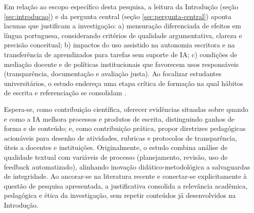 Em relação ao escopo específico desta pesquisa, a leitura da Introdução (seção \ref{sec:introducao}) e da pergunta central (seção \ref{sec:pergunta-central}) aponta lacunas que justificam a investigação: a) mensuração diferenciada de efeitos em língua portuguesa, considerando critérios de qualidade argumentativa, clareza e precisão conceitual; b) impactos do uso assistido na autonomia escritora e na transferência de aprendizados para tarefas sem suporte de IA; c) condições de mediação docente e de políticas institucionais que favorecem usos responsáveis (transparência, documentação e avaliação justa). Ao focalizar estudantes universitários, o estudo endereça uma etapa crítica de formação na qual hábitos de escrita e referenciação se consolidam \cite{unesco2023diretrizes}.

Espera-se, como contribuição científica, oferecer evidências situadas sobre quando e como a IA melhora processos e produtos de escrita, distinguindo ganhos de forma e de conteúdo; e, como contribuição prática, propor diretrizes pedagógicas acionáveis para desenho de atividades, rubricas e protocolos de transparência, úteis a docentes e instituições. Originalmente, o estudo combina análise de qualidade textual com variáveis de processo (planejamento, revisão, uso de feedback automatizado), alinhando inovação didático-metodológica a salvaguardas de integridade. Ao ancorar-se na literatura recente \cite{kobak2025llm,geng2024style,yeadon2024ai,thorp2023notauthor,nature2023groundrules,cope2023ai,wame2023recs,icmje2023ai,unesco2023diretrizes,educause2023gai,freire1987} e conectar-se explicitamente à questão de pesquisa apresentada, a justificativa consolida a relevância acadêmica, pedagógica e ética da investigação, sem repetir conteúdos já desenvolvidos na Introdução.
